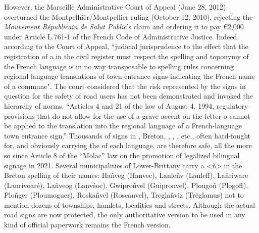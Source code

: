 \documentclass[output=paper,colorlinks,citecolor=brown]{langscibook}
\begin{document}
However, the Marseille Administrative Court of Appeal (June 28, 2012) overturned the Montpelhièr/Montpellier ruling (October 12, 2010), rejecting the \textit{Mouvement Républicain de Salut Public}{}'s claim and ordering it to pay €2,000 under Article L.761-1 of the French Code of Administrative Justice. Indeed, according to the Court of Appeal, ``judicial jurisprudence to the effect that the registration of a  in the civil register must respect the spelling and toponymy of the French language is in no way transposable to spelling rules concerning regional language translations of town entrance signs indicating the French name of a commune". The court considered that the risk represented by the signs in question for the safety of road users has not been demonstrated and invoked the hierarchy of norms. “Articles 4 and 21 of the law of August 4, 1994, regulatory provisions that do not allow for the use of a grave accent on the letter o cannot be applied to the translation into the regional language of a French-language town entrance sign.” Thousands of signs in , Breton, , , , etc., often hard-fought for, and obviously carrying the  of each language, are therefore safe, all the more so since Article 8 of the “Molac” law on the promotion of  legalized bilingual signage in 2021. Several municipalities of Lower-Brittany carry a <ñ> in the Breton spelling of their names: Hañveg (Hanvec), Lanleñv (Lanleff), Lañriware (Lanrivoaré), Lañveog (Lanvéoc), Gwiproñvel (Guipronvel), Plougoñ (Plogoff), Ploñger (Ploumoguer), Roskañvel (Roscanvel), Treglañviz (Tréglamus) not to mention dozens of townships, hamlets, localities and streets. Although the actual road signs are now protected, the only authoritative version to be used in any kind of official paperwork remains the French version.
\end{document}
